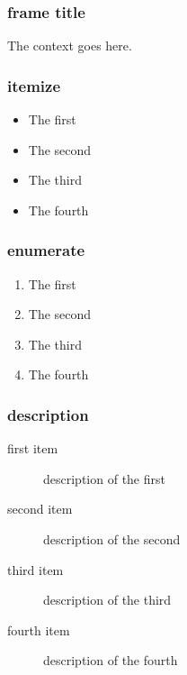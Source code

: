 
\begin{frame}[fragile]
    \frametitle{frame title}
    The context goes here.
\end{frame}

\begin{frame}[c]
    \frametitle{itemize}
    \begin{itemize}
        \item The first
        \item The second
        \item The third
        \item The fourth
    \end{itemize}
\end{frame}

\begin{frame}
    \frametitle{enumerate}
    \begin{enumerate}
        \item The first
        \item The second
        \item The third
        \item The fourth
    \end{enumerate}
\end{frame}

\begin{frame}
    \frametitle{description}
    \begin{description}
        \item[first item] description of the first
        \item[second item] description of the second
        \item[third item] description of the third
        \item[fourth item] description of the fourth
    \end{description}
\end{frame}

